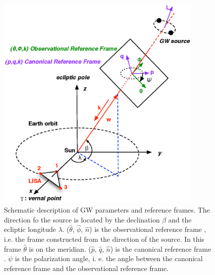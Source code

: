 \documentclass[a4paper,english,12pt]{article}
\begin{document}
\begin{figure}[!htb]
\centering \includegraphics[width=10cm]{Figures/GWParameters2.eps} 
\caption{\small Schematic description of GW parameters and reference frames.  
The direction fo the source is located by the declination $\beta$ and the ecliptic  
longitude $\lambda$. ($ \widehat{\theta}$, $ \widehat{\phi}$, $\widehat{n}$)  is the  
observational reference frame , i.e. the frame  constructed from the direction of the source.  
In this frame $ \widehat{\theta}$ is on the meridian.   
($ \widehat{p}$, $ \widehat{q}$, $\widehat{n}$) is the canonical reference frame .  
$\psi$ is the polarization angle, i. e. the angle between the canonical reference frame   
and the observational reference frame.} 
\label{GWParameters} 
\end{figure} 
\end{document}
